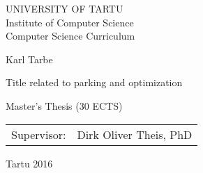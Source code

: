 \thispagestyle{empty}
\begin{center}

\large
UNIVERSITY OF TARTU\\[2mm]
Institute of Computer Science\\
Computer Science Curriculum\\[2mm]

\vspace{25mm}

\Large Karl Tarbe

\vspace{4mm}

\huge Title related to parking and optimization

\vspace{20mm}

\Large Master's Thesis (30 ECTS)

\end{center}

\vspace{2mm}

\begin{flushright}
 {
 \setlength{\extrarowheight}{5pt}
 \begin{tabular}{r l} 
  \sffamily Supervisor: & \sffamily Dirk Oliver Theis, PhD
 \end{tabular}
 }
\end{flushright}

\vfill
\centerline{Tartu 2016}

